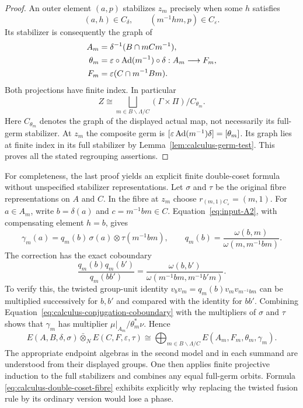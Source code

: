\begin{proof}
An outer element $(a,p)$ stabilizes $z_m$ precisely when some $h$
satisfies
\[
 (a,h)\in C_\delta,
 \qquad (m^{-1}hm,p)\in C_\varepsilon.
\]
Its stabilizer is consequently the graph of
\begin{equation}\label{eq:calculus-composed-graph}
 \begin{split}
 A_m&=\delta^{-1}(B\cap mCm^{-1}),\\
 \theta_m&=\varepsilon\circ\operatorname{Ad}(m^{-1})\circ\delta:A_m\longrightarrow F_m,\\
 F_m&=\varepsilon(C\cap m^{-1}Bm).
 \end{split}
\end{equation}
Both projections have finite index.  In particular
\begin{equation}\label{eq:calculus-double-coset-labels}
 Z\cong\bigsqcup_{m\in B\backslash\Lambda/C}
             (\Gamma\times\Pi)/C_{\theta_m}.
\end{equation}
Here $C_{\theta_m}$ denotes the graph of the displayed actual map,
not necessarily its full-germ stabilizer.
At $z_m$ the composite germ is
$[\varepsilon\operatorname{Ad}(m^{-1})\delta]=[\theta_m]$.
Its graph lies at finite index in its full stabilizer by
Lemma~\ref{lem:calculus-germ-test}.  This proves all the stated
regrouping assertions.
\end{proof}

For completeness, the last proof yields an explicit finite
double-coset formula without unspecified stabilizer representations.
Let $\sigma$ and $\tau$ be the original fibre representations on
$A$ and $C$.  In the fibre at $z_m$ choose $r_{(m,1)C_\varepsilon}=(m,1)$.
For $a\in A_m$, write $b=\delta(a)$ and $c=m^{-1}bm\in C$.
Equation~\eqref{eq:input-A2}, with compensating element $h=b$, gives
\begin{equation}\label{eq:calculus-double-coset-fibre}
 \gamma_m(a)=
 q_m(b)\,\sigma(a)\otimes\tau(m^{-1}bm),
 \qquad
 q_m(b)=\frac{\omega(b,m)}{\omega(m,m^{-1}bm)}.
\end{equation}
The correction has the exact coboundary
\begin{equation}\label{eq:calculus-conjugation-coboundary}
 \frac{q_m(b)q_m(b')}{q_m(bb')}
 =\frac{\omega(b,b')}
 {\omega(m^{-1}bm,m^{-1}b'm)}.
\end{equation}
To verify this, the twisted group-unit identity
$v_bv_m=q_m(b)v_mv_{m^{-1}bm}$ can be multiplied successively for
$b,b'$ and compared with the identity for $bb'$.
Combining Equation~\eqref{eq:calculus-conjugation-coboundary} with
the multipliers of $\sigma$ and $\tau$ shows that $\gamma_m$ has
multiplier $\mu|_{A_m}/\theta_m^*\nu$.  Hence
\begin{equation}\label{eq:calculus-double-coset-fusion}
 E(A,B,\delta,\sigma)\mathbin{\bar\otimes}_N
 E(C,F,\varepsilon,\tau)
 \cong\bigoplus_{m\in B\backslash\Lambda/C}
      E(A_m,F_m,\theta_m,\gamma_m).
\end{equation}
The appropriate endpoint algebras in the second model and in each
summand are understood from their displayed groups.
One then applies finite projective induction to the full stabilizers
and combines any equal full-germ orbits.  Formula
\eqref{eq:calculus-double-coset-fibre} exhibits explicitly why replacing
the twisted fusion rule by its ordinary version would lose a phase.

